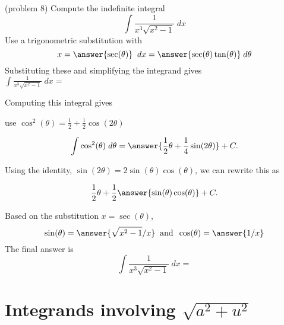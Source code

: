 \documentclass[handout]{ximera}
\begin{document}
\begin{problem}(problem 8)
Compute the indefinite integral
\[
\int \frac{1}{x^3\sqrt{x^2-1}} \; dx
\]
Use a trigonometric substitution with\\
\[
x = \answer{\sec(\theta)} \;\; dx = \answer{ \sec(\theta)\tan(\theta)} \; d\theta
\]
Substituting these and simplifying the integrand gives\\
$\displaystyle{\int  \frac{1}{x^3\sqrt{x^2-1}}\; dx =}$\\
\begin{multipleChoice}
\end{multipleChoice}

Computing this integral gives
\begin{hint}
use $\cos^2(\theta) = \frac12 + \frac12 \cos(2\theta)$
\end{hint}

\[
\int \cos^2(\theta) \; d\theta = \answer{\frac12 \theta + \frac14 \sin(2\theta) } + C.
\]

Using the identity, $\sin(2\theta) = 2\sin(\theta)\cos(\theta)$, we can rewrite this as

\[
\frac12 \theta + \frac12 \answer{\sin(\theta) \cos(\theta)} + C.
\]

Based on the substitution $x = \sec(\theta)$, \\
\[
\sin(\theta) = \answer{\sqrt{x^2 -1}/x} \;\; \text{and} \;\; \cos(\theta) = \answer{1/x}
\]
The final answer is
\[
\int   \frac{1}{x^3\sqrt{x^2-1}} \; dx = 
\]

\begin{center}
\begin{multipleChoice}
\end{multipleChoice}
\end{center}


\end{problem}





\section{Integrands involving $\sqrt{a^2 + u^2}$}
\end{document}
